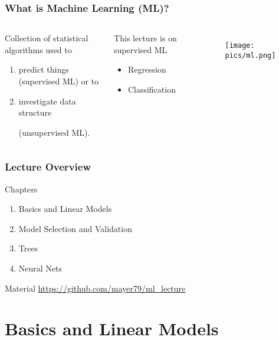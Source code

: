 \documentclass[
    utf8,
    aspectratio=169
]{beamer}  %
\begin{document}
\begin{frame}
	\frametitle{What is Machine Learning (ML)?}
	\begin{columns}
		\begin{block}{Collection of statistical algorithms used to}
			\begin{enumerate}
				\item predict things (supervised ML) or to
				\item investigate data structure 
				
				(unsupervised ML).
			\end{enumerate}
		\end{block}	
		\begin{block}{This lecture is on supervised ML}
			\begin{itemize}
				\item Regression
				\item Classification
			\end{itemize}
		\end{block}
		\begin{figure}
			\texttt{[image: pics/ml.png]}
		\end{figure}
	\end{columns}
\end{frame}

\begin{frame}
	\frametitle{Lecture Overview}
	\begin{block}{Chapters}
		\begin{enumerate}
			\item Basics and Linear Models
			\item Model Selection and Validation
			\item Trees
			\item Neural Nets
		\end{enumerate}
	\end{block}
	
	\begin{block}{Material}
		\url{https://github.com/mayer79/ml\_lecture}
	\end{block}
\end{frame}

\section{Basics and Linear Models}
\end{document}

